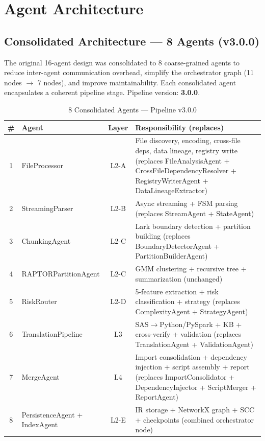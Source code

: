 \documentclass[11pt,a4paper]{article}
\begin{document}
\section{Agent Architecture}

\subsection{Consolidated Architecture — 8 Agents (v3.0.0)}

\begin{infobox}
The original 16-agent design was consolidated to 8 coarse-grained agents to reduce inter-agent communication overhead, simplify the orchestrator graph (11 nodes $\to$ 7 nodes), and improve maintainability. Each consolidated agent encapsulates a coherent pipeline stage. Pipeline version: \textbf{3.0.0}.
\end{infobox}

\begin{table}[H]
\centering
\caption{8 Consolidated Agents — Pipeline v3.0.0}
\renewcommand{\arraystretch}{1.25}
\small
\begin{tabularx}{\textwidth}{@{} c l c X @{}}
\toprule
\textbf{\#} & \textbf{Agent} & \textbf{Layer} & \textbf{Responsibility (replaces)} \\
\midrule
1 & FileProcessor & L2-A & File discovery, encoding, cross-file deps, data lineage, registry write (replaces FileAnalysisAgent + CrossFileDependencyResolver + RegistryWriterAgent + DataLineageExtractor) \\
2 & StreamingParser & L2-B & Async streaming + FSM parsing (replaces StreamAgent + StateAgent) \\
3 & ChunkingAgent & L2-C & Lark boundary detection + partition building (replaces BoundaryDetectorAgent + PartitionBuilderAgent) \\
4 & RAPTORPartitionAgent & L2-C & GMM clustering + recursive tree + summarization (unchanged) \\
5 & RiskRouter & L2-D & 5-feature extraction + risk classification + strategy (replaces ComplexityAgent + StrategyAgent) \\
6 & TranslationPipeline & L3 & SAS$\to$Python/PySpark + KB + cross-verify + validation (replaces TranslationAgent + ValidationAgent) \\
7 & MergeAgent & L4 & Import consolidation + dependency injection + script assembly + report (replaces ImportConsolidator + DependencyInjector + ScriptMerger + ReportAgent) \\
8 & PersistenceAgent + IndexAgent & L2-E & IR storage + NetworkX graph + SCC + checkpoints (combined orchestrator node) \\
\bottomrule
\end{tabularx}
\end{table}
\end{document}
